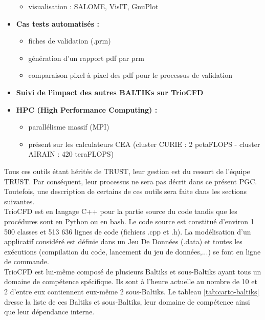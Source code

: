 \begin{itemize}[label=$\Rightarrow$, font=\LARGE]
\begin{itemize}
    \item visualisation : SALOME, VisIT, GnuPlot
  \end{itemize}
  \item \textbf{Cas tests automatisés :}
  \begin{itemize}
    \item fiches de validation (.prm)
    \item g\'en\'eration d'un rapport pdf par prm
    \item comparaison pixel \`a pixel des pdf pour le processus de validation
  \end{itemize}
  \item \textbf{Suivi de l'impact des autres BALTIKs sur TrioCFD}
  \item \textbf{HPC (High Performance Computing) :}
  \begin{itemize}
    \item parallélisme massif (MPI)
    \item pr\'esent sur les calculateurs CEA (cluster CURIE : 2 petaFLOPS - cluster AIRAIN : 420 teraFLOPS)
  \end{itemize}
\end{itemize}\smallskip

Tous ces outils étant hérités de TRUST, leur gestion est du ressort de l'équipe TRUST. Par conséquent, leur processus ne sera pas décrit dans ce présent PGC. Toutefois, une description de certains de ces outils sera faite dans les sections suivantes.\\
TrioCFD est en langage C++ pour la partie source du code tandis que les procédures sont en Python ou en bash. Le code source est constitué d'environ 1 500 classes et 513 636 lignes de code (fichiers .cpp et .h). La mod\'elisation d'un applicatif considéré est définie dans un Jeu De Données (.data) et toutes les ex\'ecutions (compilation du code, lancement du jeu de données,...) se font en ligne de commande. \smallskip\\

TrioCFD est lui-même composé de plusieurs Baltiks et sous-Baltiks ayant tous un domaine de compétence spécifique. Ils sont \`a l'heure actuelle au nombre de 10 et 2 d'entre eux contiennent eux-même 2 sous-Baltiks. Le tableau \ref{tab:carto-baltiks} dresse la liste de ces Baltiks et sous-Baltiks, leur domaine de compétence ainsi que leur dépendance interne.

